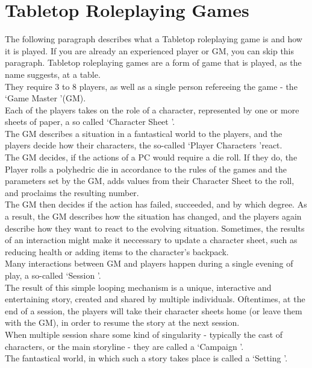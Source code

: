 \section{Tabletop Roleplaying Games}\label{sec:ttrpgs}
The following paragraph describes what a Tabletop roleplaying game is and how it is played.
If you are already an experienced player or GM, you can skip this paragraph.
Tabletop roleplaying games are a form of game that is played, as the name suggests, at a table.\\
They require 3 to 8 players, as well as a single person refereeing the game - the \lq Game Master \rq (GM).\\
Each of the players takes on the role of a character, represented by one or more sheets of paper, a so called \lq Character Sheet \rq.\\
The GM describes a situation in a fantastical world to the players, and the players decide how their characters, the so-called \lq Player Characters \rq react.\\
The GM decides, if the actions of a PC would require a die roll.
If they do, the Player rolls a polyhedric die in accordance to the rules of the games and the parameters set by the GM, adds values from their Character Sheet to the roll, and proclaims the resulting number.\\
The GM then decides if the action has failed, succeeded, and by which degree.
As a result, the GM describes how the situation has changed, and the players again describe how they want to react to the evolving situation.
Sometimes, the results of an interaction might make it neccessary to update a character sheet, such as reducing health or adding items to the character's backpack.\\
Many interactions between GM and players happen during a single evening of play, a so-called \lq Session \rq.\\
The result of this simple looping mechanism is a unique, interactive and entertaining story, created and shared by multiple individuals.
Oftentimes, at the end of a session, the players will take their character sheets home (or leave them with the GM), in order to resume the story at the next session.\\
When multiple session share some kind of singularity - typically the cast of characters, or the main storyline - they are called a \lq Campaign \rq.\\
The fantastical world, in which such a story takes place is called a \lq Setting \rq.